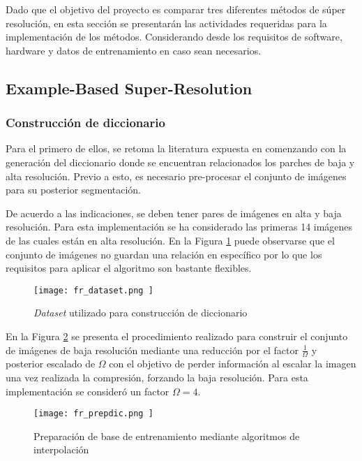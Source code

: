 \noindent
Dado que el objetivo del proyecto es comparar tres diferentes métodos 
de súper resolución, en esta sección se presentarán las actividades
requeridas para la implementación de los métodos. Considerando desde los 
requisitos de software, hardware y datos de entrenamiento en caso sean 
necesarios. 

\subsection{Example-Based Super-Resolution}
\subsubsection{Construcción de diccionario}
\noindent
Para el primero de ellos, se retoma la literatura expuesta en \cite{freeman}
comenzando con la generación del diccionario donde se encuentran relacionados 
los parches de baja y alta resolución. Previo a esto, es necesario pre-procesar
el conjunto de imágenes para su posterior segmentación. 

De acuerdo a las indicaciones, se deben tener pares de imágenes en alta y baja 
resolución. Para esta implementación se ha considerado las primeras 14 imágenes
de \cite{MIRFLICKR} las cuales están en alta resolución. En la Figura \ref{fig:fr_dataset}
puede observarse que el conjunto de imágenes no guardan una relación en específico
por lo que los requisitos para aplicar el algoritmo son bastante flexibles.

\begin{figure}[H]
    \texttt{[image:  fr\_dataset.png ]}
    \centering
    \caption{ \emph{Dataset} utilizado para construcción de diccionario}
    \label{fig:fr_dataset}
\end{figure}

En la Figura \ref{fig:fr_interpolacion} se presenta el procedimiento realizado para
construir el conjunto de imágenes de baja resolución mediante una reducción por el 
factor $\frac{1}{\Omega}$ y posterior escalado de $\Omega$ con el objetivo de 
perder información al escalar la imagen una vez realizada la compresión, forzando
la baja resolución. Para esta implementación se consideró un factor $\Omega = 4$. 

\begin{figure}[H]
    \texttt{[image:  fr\_prepdic.png ]}
    \centering
    \caption{Preparación de base de entrenamiento mediante algoritmos de interpolación}
    \label{fig:fr_interpolacion}
\end{figure}

